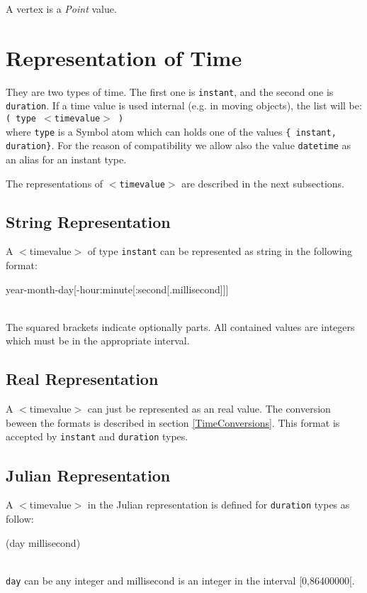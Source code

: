 \documentclass[english,a4paper]{article}
\begin{document}
A vertex is a \emph{Point} value.



\section{Representation of Time}
They are two types of time. The first one is {\tt instant}, and the 
second one is {\tt duration}. If a time value is used internal (e.g.
in moving objects), the list will be:\\
  {\tt ( type $<$timevalue$>$ )}\\
where {\tt type} is a Symbol atom which can holds one of the values
{\tt\{ instant, duration\}}. For the reason of compatibility we
allow also the value {\tt datetime} as an alias for an instant type. 

The representations of {\tt $<$timevalue$>$} are described
in the next subsections.

\subsection{String Representation}
\label{StringRepOfTime}
A $<$timevalue$>$ of type {\tt instant} can be represented as 
string in the following format: \\
\begin{tt}
  \begin{small}
      year-month-day[-hour:minute[:second[.millisecond]]]
  \end{small}
\end{tt}\\
The squared brackets indicate optionally parts. All contained values
are integers which must be in the appropriate interval. 

\subsection{Real Representation}
A $<$timevalue$>$ can just be represented as an real value. 
The conversion beween the formats is described in section 
\ref{TimeConversions}. This format is accepted by {\tt instant} and
{\tt duration} types.

\subsection{Julian Representation}
A $<$timevalue$>$ in the Julian representation is defined for {\tt duration} 
types as follow:\\
\begin{tt}
  \begin{small}
      (day millisecond)
  \end{small}
\end{tt}\\
{\tt day} can be any integer and millisecond is an integer in 
the interval [0,86400000[. 
\end{document}
